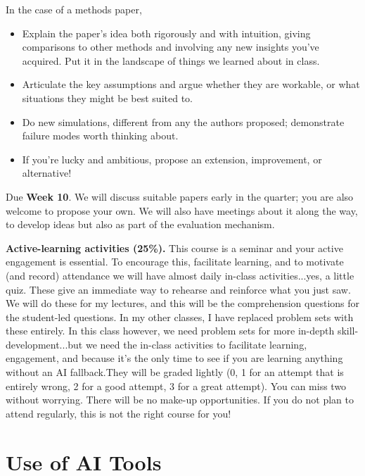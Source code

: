 \documentclass[PS]{syllabus}
\begin{document}
\begin{syllabus}
In the case of a methods paper,
\begin{itemize}
\item Explain the paper's idea both rigorously and with intuition, giving comparisons to other methods and involving any new insights you've acquired. Put it in the landscape of things we learned about in class.
\item Articulate the key assumptions and argue whether they are workable, or what situations they might be best suited to.
\item Do new simulations, different from any the authors proposed; demonstrate failure modes worth thinking about. 
\item If you're lucky and ambitious, propose an extension, improvement, or alternative!
\end{itemize}


Due \textbf{Week 10}. We will discuss suitable papers early in the quarter; you are also welcome to propose your own. We will also have meetings about it along the way, to develop ideas but also as part of the evaluation mechanism.

\textbf{Active-learning activities (25\%).} This course is a seminar and your active engagement is essential. To encourage this, facilitate learning, and to motivate (and record) attendance we will have almost daily in-class activities...yes, a little quiz. These give an immediate way to rehearse and reinforce what you just saw. We will do these for my lectures, and this will be the comprehension questions for the student-led questions. In my other classes, I have replaced problem sets with these entirely. In this class however, we need problem sets for more in-depth skill-development...but we need the in-class activities to facilitate learning, engagement, and because it's the only time to see if you are learning anything without an AI fallback.They will be graded lightly (0, 1 for an attempt that is entirely wrong, 2 for a good attempt, 3 for a great attempt). You can miss two without worrying. There will be no make-up opportunities. If you do not plan to attend regularly, this is not the right course for you!


\section{Use of AI Tools}


\end{syllabus}
\end{document}
